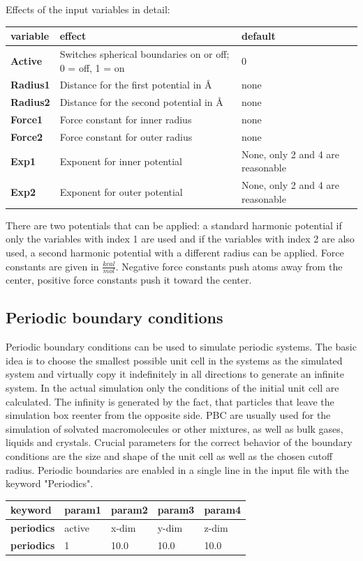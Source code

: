 \documentclass[10pt,a4paper]{article} %
\begin{document}
	Effects of the input variables in detail:
	\begin{longtable}{|p{3cm}|p{5cm}|p{3cm}|}
		\textbf{variable} & effect & default \\
		\hline
		\textbf{Active} & Switches spherical boundaries on or off; 0 = off, 1 = on & 0 \\
		\textbf{Radius1} & Distance for the first potential in \AA & none \\
		\textbf{Radius2} & Distance for the second potential in \AA & none \\
		\textbf{Force1} & Force constant for inner radius & none \\
		\textbf{Force2} & Force constant for outer radius & none \\
		\textbf{Exp1} & Exponent for inner potential & None, only 2 and 4 are reasonable \\
		\textbf{Exp2} & Exponent for outer potential & None, only 2 and 4 are reasonable \\
	\end{longtable}
	There are two potentials that can be applied: a standard harmonic potential if only the variables with index 1 are used and if the variables with index 2 are also used, a second harmonic potential with a different radius can be applied.
	Force constants are given in $\frac{kcal}{mol}$. Negative force constants push atoms away from the center, positive force constants push it toward the center.

	\subsection{Periodic boundary conditions}
	Periodic boundary conditions can be used to simulate periodic systems. The basic idea is to choose the smallest possible unit cell in the systems as the simulated system and virtually copy it indefinitely in all directions to generate an infinite system. In the actual simulation only the conditions of the initial unit cell are calculated. The infinity is generated by the fact, that particles that leave the simulation box reenter from the opposite side. \acf{PBC} are usually used for the simulation of solvated macromolecules or other mixtures, as well as bulk gases, liquids and crystals. Crucial parameters for the correct behavior of the boundary conditions are the size and shape of the unit cell as well as the chosen cutoff radius. Periodic boundaries are enabled in a single line in the input file with the keyword "Periodics".\\
	\begin{longtable}{l|l|l|l|l}
		\textbf{keyword} & param1 & param2 & param3 & param4 \\
		\hline
		\textbf{periodics} & active & x-dim & y-dim & z-dim \\
		\textbf{periodics} & 1 & 10.0 & 10.0 & 10.0 \\
	\end{longtable}
\end{document}
